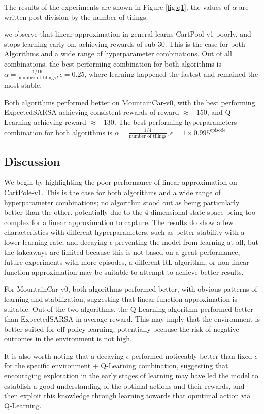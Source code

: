 \documentclass{article in the early stages}
\begin{document}
The results of the experiments are shown in Figure \ref{fig:q1}, the values of $\alpha$ are
written post-division by the number of tilings.

we observe that linear approximation in general learns CartPool-v1 poorly, and stops learning
early on, achieving rewards of sub-$30$. This is the case for both Algorithms and a wide range of
hyperparameter combinations. Out of all combinations, the best-performing combination for both
algorithms is $\alpha = \frac{1/16}{\text{number of tilings}}, \epsilon = 0.25$, where learning
happened the fastest and remained the most stable.

Both algorithms performed better on MountainCar-v0, with the best performing ExpectedSARSA achieving consistent rewards of
reward $\approx -150$, and Q-Learning achieving reward $\approx -130$. The best performing hyperparameters
combination for both algorithms is $\alpha = \frac{1/4}{\text{number of tilings}}, \epsilon = 1\times
0.995^{\text{episode}}$.

\subsection{Discussion}
We begin by highlighting the poor performance of linear approximation on CartPole-v1. This is
the case for both algorithms and a wide range of hyperparameter combinations; no algorithm
stood out as being particularly better than the other.
potentially due to the 4-dimensional state space being too complex for a linear approximation to capture.
The results do show a few characteristics with different hyperparameters, such as better stability with a
lower learning rate, and decaying $\epsilon$ preventing the model from learning at all, but
the takeaways are limited because this is not based on a great performance,
future experiments with more episodes, a different RL algorithm, or non-linear function approximation
may be suitable to attempt to achieve better results.

For MountainCar-v0, both algorithms performed better, with obvious patterns of learning and
stabilization, suggesting that linear function approximation is suitable.
Out of the two algorithms, the Q-Learning algorithm performed better than ExpectedSARSA in average reward.
This may imply that the environment is better suited for off-policy learning, potentially
because the risk of negative outcomes in the environment is not high.

It is also worth noting that a decaying $\epsilon$ performed noticeably better than fixed $\epsilon$
for the specific environment + Q-Learning combination, suggesting that encouraging exploration
in the early stages of learning may have led the model to establish a good understanding of the
optimal actions and their rewards, and then exploit this knowledge through learning towards that
opmtimal action via Q-Learning.
\end{document}
